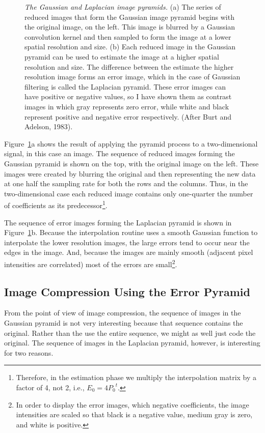 \begin{figure}
\centerline{
}
\caption[Image pyramid construction]{
{\em The Gaussian and Laplacian image pyramids.}  (a) The series of
reduced images that form the Gaussian image pyramid begins with the
original image, on the left.  This image is blurred by a Gaussian
convolution kernel and then sampled to form the image at a lower
spatial resolution and size.  (b) Each reduced image in the Gaussian
pyramid can be used to estimate the image at a higher spatial
resolution and size.  The difference between the estimate the higher
resolution image forms an error image, which in the case of Gaussian
filtering is called the Laplacian pyramid.  These error images can
have positive or negative values, so I have shown them as contrast
images in which gray represents zero error, while white and black
represent positive and negative error respectively.  (After Burt and
Adelson, 1983).  }
\label{f7:pyramid2d}
\end{figure}
Figure~\ref{f7:pyramid2d}a shows the result of applying the pyramid
process to a two-dimensional signal, in this case an image.  The
sequence of reduced images forming the Gaussian pyramid is shown on
the top, with the original image on the left.  These images were
created by blurring the original and then representing the new data at
one half the sampling rate for both the rows and the columns.  Thus,
in the two-dimensional case each reduced image contains only
one-quarter the number of coefficients as its
predecessor\footnote{Therefore, in the estimation phase we multiply
the interpolation matrix by a factor of 4, not 2, i.e., $E_0 = 4
{P_0}^t$.}.

The sequence of error images forming the Laplacian pyramid is shown in
Figure~\ref{f7:pyramid2d}b.  Because the interpolation routine uses a
smooth Gaussian function to interpolate the lower resolution images,
the large errors tend to occur near the edges in the image.  And,
because the images are mainly smooth (adjacent pixel intensities are
correlated) most of the errors are small\footnote{In order to display
the error images, which negative coefficients, the image intensities
are scaled so that black is a negative value, medium gray is zero, and
white is positive.}.

\subsection*{Image Compression Using the Error Pyramid}
From the point of view of image compression, the sequence of images in
the Gaussian pyramid is not very interesting because that sequence
contains the original.  Rather than the use the entire sequence, we
might as well just code the original.  The sequence of images in the
Laplacian pyramid, however, is interesting for two reasons.


